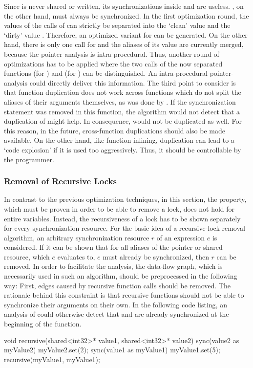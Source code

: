 Since  is never shared or written, its synchronizations inside  and  are useless. , on the other hand, must always be synchronized. In the first optimization round, the values of the calls of  can strictly be separated into the `clean' value  and the `dirty' value . Therefore, an optimized variant for  can be generated. On the other hand, there is only one call for  and the aliases of its value are currently merged, because the pointer-analysis is intra-procedural. Thus, another round of optimizations has to be applied where the two calls of the now separated functions  (for ) and  (for ) can be distinguished. An intra-procedural pointer-analysis could directly deliver this information. The third point to consider is that function duplication does not work across functions which do not split the aliases of their arguments themselves, as was done by . If the synchronization statement was removed in this function, the algorithm would not detect that a duplication of  might help. In consequence,  would not be duplicated as well. For this reason, in the future, cross-function duplications should also be made available. On the other hand, like function inlining, duplication can lead to a `code explosion' if it is used too aggressively. Thus, it should be controllable by the programmer.

\subsubsection{Removal of Recursive Locks}
In contrast to the previous optimization techniques, in this section, the property, which must be proven in order to be able to remove a lock, does not hold for entire variables. Instead, the recursiveness of a lock has to be shown separately for every synchronization resource. For the basic idea of a recursive-lock removal algorithm, an arbitrary synchronization resource $r$ of an expression $e$ is considered. If it can be shown that for all aliases of the pointer or shared resource, which $e$ evaluates to, $e$ must already be synchronized, then $r$ can be removed. In order to facilitate the analysis, the data-flow graph, which is necessarily used in such an algorithm, should be preprocessed in the following way: First, edges caused by recursive function calls should be removed. The rationale behind this constraint is that recursive functions should not be able to synchronize their arguments on their own. In the following code listing, an analysis of  could otherwise  detect that  and  are already synchronized at the beginning of the function.
\begin{ccode}
void recursive(shared<int32>* value1, shared<int32>* value2) {
  sync(value2 as myValue2) {
    myValue2.set(2);
  }
  sync(value1 as myValue1) {
    myValue1.set(5);
    recursive(myValue1, myValue1);
  }
}
\end{ccode}

